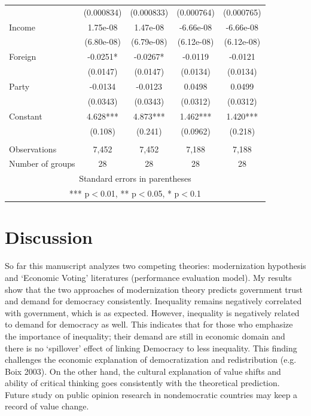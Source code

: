 \documentclass[12pt]{article}\usepackage[]{graphicx}\usepackage[]{color}
\begin{document}
\begin{table}[htbp]
\begin{tabular}{lcccc}
		& (0.000834) & (0.000833) & (0.000764) & (0.000765) \\
		Income & 1.75e-08 & 1.47e-08 & -6.66e-08 & -6.66e-08 \\
		& (6.80e-08) & (6.79e-08) & (6.12e-08) & (6.12e-08) \\
		Foreign & -0.0251* & -0.0267* & -0.0119 & -0.0121 \\
		& (0.0147) & (0.0147) & (0.0134) & (0.0134) \\
		Party & -0.0134 & -0.0123 & 0.0498 & 0.0499 \\
		& (0.0343) & (0.0343) & (0.0312) & (0.0312) \\
		Constant & 4.628*** & 4.873*** & 1.462*** & 1.420*** \\
		& (0.108) & (0.241) & (0.0962) & (0.218) \\
		&       &       &       &  \\
		Observations & 7,452 & 7,452 & 7,188 & 7,188 \\
		Number of groups & 28    & 28    & 28    & 28 \\
		\hline
		\multicolumn{5}{c}{Standard errors in parentheses} \\
		\multicolumn{5}{c}{*** p$<$0.01, ** p$<$0.05, * p$<$0.1} \\
		
	\end{tabular}%
\end{table}%


\section{Discussion}
So far this manuscript analyzes two competing theories: modernization hypothesis and `Economic Voting' literatures (performance evaluation model). My results show that the two approaches of modernization theory predicts government trust and demand for democracy consistently. Inequality remains negatively correlated with government, which is as expected. However, inequality is negatively related to demand for democracy as well. This indicates that for those who emphasize the importance of inequality; their demand are still in economic domain and there is no `spillover' effect of linking Democracy to less inequality. This finding challenges the economic explanation of democratization and redistribution (e.g. Boix 2003). On the other hand, the cultural explanation of value shifts and ability of critical thinking goes consistently with the theoretical prediction. Future study on public opinion research in nondemocratic countries may keep a record of value change.
\end{document}
